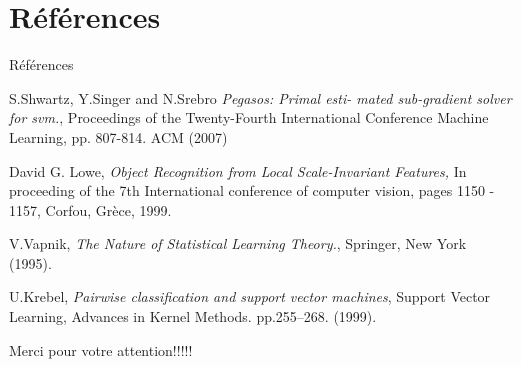 \documentclass[11pt]{beamer}
\begin{document}
\section*{Références}
\begin{frame}{Références}
\begin{thebibliography}{9}

 S.Shwartz, Y.Singer and N.Srebro \emph{ Pegasos: Primal esti-
mated sub-gradient solver for svm.}, Proceedings of the Twenty-Fourth International Conference Machine Learning, pp. 807-814. ACM (2007)

 David G. Lowe, \emph{Object Recognition from Local Scale-Invariant Features,} In proceeding of the 7th International conference of computer vision, pages 1150 - 1157, Corfou, Grèce, 1999.
 
 V.Vapnik, \emph{The Nature of Statistical Learning Theory.}, Springer, New York (1995).

 U.Krebel, \emph{Pairwise classification and support vector machines}, Support Vector Learning, Advances in Kernel Methods. pp.255–268. (1999).


\end{thebibliography}
\end{frame}

\begin{frame}
 \Huge Merci pour votre attention!!!!!
\end{frame}
\end{document}
